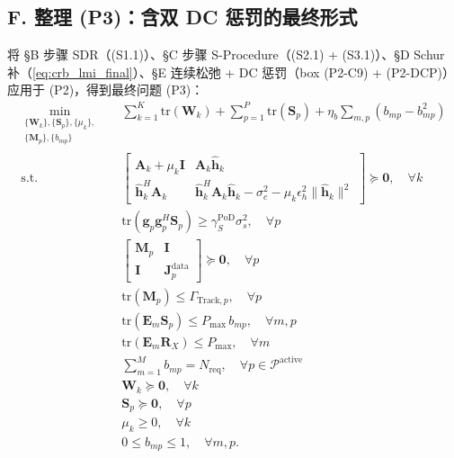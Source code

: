 \documentclass[12pt,a4paper]{article}
\newcommand{\vect}[1]{\mathbf{#1}}
\newcommand{\mat}[1]{\mathbf{#1}}
\newcommand{\tr}{\text{tr}}
\begin{document}
\subsection*{F. 整理 (P3)：含双 DC 惩罚的最终形式}

将 §B 步骤 SDR（(S1.1)）、§C 步骤 S-Procedure（(S2.1) + (S3.1)）、§D Schur 补（\eqref{eq:crb_lmi_final}）、§E 连续松弛 + DC 惩罚（box (P2-C9) + (P2-DCP)）应用于 (P2)，得到最终问题 (P3)：
\begin{align}
\min_{\substack{\{\mat{W}_k\}, \{\mat{S}_p\}, \{\mu_k\}, \\ \{\mat{M}_p\}, \{b_{mp}\}}} \quad
& \sum_{k=1}^K \tr(\mat{W}_k) + \sum_{p=1}^P \tr(\mat{S}_p) + \eta_b \sum_{m, p} (b_{mp} - b_{mp}^2) \tag{P3} \\
\text{s.t.} \quad
& \begin{bmatrix} \mat{A}_k + \mu_k \mat{I} & \mat{A}_k \hat{\vect{h}}_k \\[1.5ex] \hat{\vect{h}}_k^H \mat{A}_k & \hat{\vect{h}}_k^H \mat{A}_k \hat{\vect{h}}_k - \sigma_c^2 - \mu_k \epsilon_h^2 \|\hat{\vect{h}}_k\|^2 \end{bmatrix} \succeq \mat{0}, \quad \forall k \tag{P3-C1} \label{eq:p3c1} \\
& \tr(\vect{g}_p \vect{g}_p^H \mat{S}_p) \geq \gamma_S^{\text{PoD}} \sigma_s^2, \quad \forall p \tag{P3-C2} \label{eq:p3c2} \\
& \begin{bmatrix} \mat{M}_p & \mat{I} \\ \mat{I} & \mat{J}_p^{\text{data}} \end{bmatrix} \succeq \mat{0}, \quad \forall p \tag{P3-C3} \label{eq:p3c3} \\
& \tr(\mat{M}_p) \leq \Gamma_{\text{Track},p}, \quad \forall p \tag{P3-C3b} \label{eq:p3c3b} \\
& \tr(\mat{E}_m \mat{S}_p) \leq P_{\max} \, b_{mp}, \quad \forall m, p \tag{P3-C4'a} \label{eq:p3c4a} \\
& \tr(\mat{E}_m \mat{R}_X) \leq P_{\max}, \quad \forall m \tag{P3-C4'b} \label{eq:p3c4b} \\
& \sum_{m=1}^{M} b_{mp} = N_{\text{req}}, \quad \forall p \in \mathcal{P}^{\text{active}} \tag{P3-C5'} \label{eq:p3c5} \\
& \mat{W}_k \succeq \mat{0}, \quad \forall k \tag{P3-C6} \label{eq:p3c6} \\
& \mat{S}_p \succeq \mat{0}, \quad \forall p \tag{P3-C7} \label{eq:p3c7} \\
& \mu_k \geq 0, \quad \forall k \tag{P3-C8} \label{eq:p3c8} \\
& 0 \leq b_{mp} \leq 1, \quad \forall m, p. \tag{P3-C9} \label{eq:p3c9}
\end{align}
\end{document}
